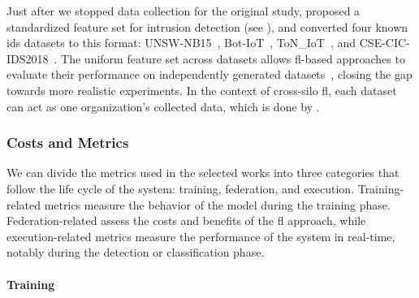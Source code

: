 Just after we stopped data collection for the original study, \citet{sarhan_standardfeatureset_2021} proposed a standardized feature set for intrusion detection (see ), and converted four known \gls{ids} datasets to this format: UNSW-NB15~\cite{moustafa_UNSWNB15comprehensivedata_2015}, Bot-IoT~\cite{koroniotis_developmentrealisticbotnet_2019}, ToN\_IoT~\cite{moustafa_FederatedTON_IoTWindows_2020}, and CSE-CIC-IDS2018~\cite{sharafaldin_GeneratingNewIntrusion_2018}.
The uniform feature set across datasets allows \gls{fl}-based approaches to evaluate their performance on independently generated datasets~\cite{de_carvalho_bertoli_generalizing_2023,popoola_FederatedDeepLearning_2021}, closing the gap towards more realistic experiments.
In the context of cross-silo \gls{fl}, each dataset can act as one organization's collected data, which is done by  \citet{de_carvalho_bertoli_generalizing_2023}.


\subsubsection{Costs and Metrics\label{sec:sota.quali.metrics}}

We can divide the metrics used in the selected works into three categories that follow the life cycle of the system: training, federation, and execution.
Training-related metrics measure the behavior of the model during the training phase.
Federation-related assess the costs and benefits of the \gls{fl} approach, while execution-related metrics measure the performance of the system in real-time, notably during the detection or classification phase.

\paragraph{Training}

